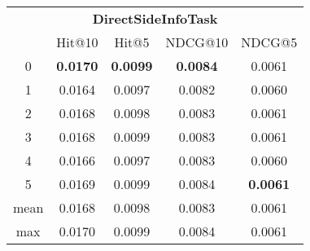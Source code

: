 \documentclass{article}
\begin{document}
 

\begin{tabular}{c|cccc}

\multicolumn{5}{c}{\textbf{DirectSideInfoTask}} \\
\noalign{\smallskip}
\noalign{\smallskip}
\toprule
\multicolumn{1}{c}{Template ID} & \multicolumn{1}{|c}{Hit@10} & \multicolumn{1}{c}{Hit@5} & \multicolumn{1}{c}{NDCG@10} & \multicolumn{1}{c}{NDCG@5} \\
\midrule
0 & \textbf{0.0170} & \textbf{0.0099} & \textbf{0.0084} & 0.0061 \\
1 & 0.0164 & 0.0097 & 0.0082 & 0.0060 \\
2 & 0.0168 & 0.0098 & 0.0083 & 0.0061 \\
3 & 0.0168 & 0.0099 & 0.0083 & 0.0061 \\
4 & 0.0166 & 0.0097 & 0.0083 & 0.0060 \\
5 & 0.0169 & 0.0099 & 0.0084 & \textbf{0.0061} \\
\midrule
mean & 0.0168 & 0.0098 & 0.0083 & 0.0061 \\
max & 0.0170 & 0.0099 & 0.0084 & 0.0061 \\
\bottomrule

\end{tabular}
\end{document}
